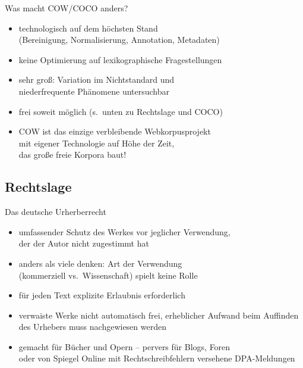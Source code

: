 \begin{frame}
	{Was macht COW/COCO anders?}
	\begin{itemize}
	  \item technologisch auf dem höchsten Stand\\(Bereinigung, Normalisierung, Annotation, Metadaten)
	  \item keine Optimierung auf lexikographische Fragestellungen
	  \item sehr \alert{groß}: Variation im Nichtstandard und\\niederfrequente Phänomene untersuchbar
	  \item \alert{frei} soweit möglich (s.\ unten zu Rechtslage und COCO)
	  
	  \vspace{0.5cm}
	   
	  \item \alert{COW ist das einzige verbleibende Webkorpusprojekt\\mit eigener Technologie auf Höhe der Zeit,\\das große freie Korpora baut!}
	\end{itemize}
\end{frame}

\subsection{Rechtslage}

\begin{frame}
	{Das deutsche Urherberrecht}
	\begin{itemize}
	  \item umfassender Schutz des Werkes vor jeglicher Verwendung,\\der der Autor nicht zugestimmt hat
	  \item anders als viele denken: Art der Verwendung\\(kommerziell vs.\ Wissenschaft) spielt \alert{keine Rolle}
	  \item für jeden Text explizite Erlaubnis erforderlich
	  \item verwaiste Werke nicht automatisch frei, erheblicher Aufwand beim Auffinden des Urhebers muss nachgewiesen werden
	  \item gemacht für Bücher und Opern -- pervers für Blogs, Foren\\oder von Spiegel Online mit Rechtschreibfehlern versehene DPA-Meldungen  
	\end{itemize}
\end{frame}

